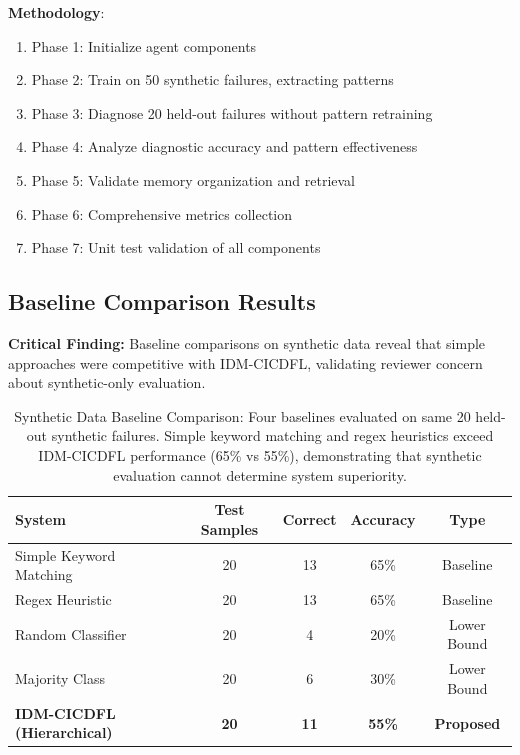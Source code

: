 \documentclass[11pt]{article}
\begin{document}
\textbf{Methodology}:
\begin{enumerate}
    \item Phase 1: Initialize agent components
    \item Phase 2: Train on 50 synthetic failures, extracting patterns
    \item Phase 3: Diagnose 20 held-out failures without pattern retraining
    \item Phase 4: Analyze diagnostic accuracy and pattern effectiveness
    \item Phase 5: Validate memory organization and retrieval
    \item Phase 6: Comprehensive metrics collection
    \item Phase 7: Unit test validation of all components
\end{enumerate}

\subsection{Baseline Comparison Results}

\textbf{Critical Finding:} Baseline comparisons on synthetic data reveal that simple approaches were competitive with IDM-CICDFL, validating reviewer concern about synthetic-only evaluation.

\begin{table}[h!]
\centering
\begin{tabular}{lcccc}
\toprule
\textbf{System} & \textbf{Test Samples} & \textbf{Correct} & \textbf{Accuracy} & \textbf{Type} \\
\midrule
Simple Keyword Matching & 20 & 13 & 65\% & Baseline \\
Regex Heuristic & 20 & 13 & 65\% & Baseline \\
Random Classifier & 20 & 4 & 20\% & Lower Bound \\
Majority Class & 20 & 6 & 30\% & Lower Bound \\
\midrule
\textbf{IDM-CICDFL (Hierarchical)} & \textbf{20} & \textbf{11} & \textbf{55\%} & \textbf{Proposed} \\
\bottomrule
\end{tabular}
\caption{Synthetic Data Baseline Comparison: Four baselines evaluated on same 20 held-out synthetic failures. Simple keyword matching and regex heuristics exceed IDM-CICDFL performance (65\% vs 55\%), demonstrating that synthetic evaluation cannot determine system superiority.}
\label{tab:baseline_synthetic}
\end{table}
\end{document}
